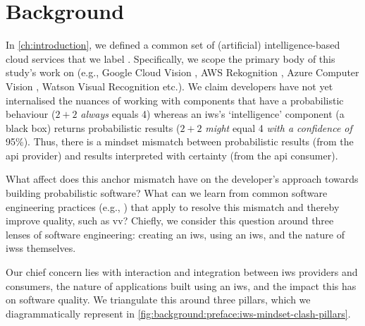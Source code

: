 \chapter{Background}
\label{ch:background}

\graphicspath{{mainmatter/background/figures/}}

\label{sec:background:preface}

In \cref{ch:introduction}, we defined a common set of (artificial) intelligence-based cloud services that we label . Specifically, we scope the primary body of this study's work on  (e.g., Google Cloud Vision \citep{GoogleCloud:Home}, AWS Rekognition \citep{AWS:Home}, Azure Computer Vision \citep{Azure:Home}, Watson Visual Recognition \citep{IBM:Home} etc.). We claim developers have not yet internalised the nuances of working with components that have a probabilistic behaviour ($2+2$ \textit{always} equals 4) whereas an \gls{iws}'s `intelligence' component (a black box) returns probabilistic results ($2+2$ \textit{might} equal 4 \textit{with a confidence of} 95\%). Thus, there is a mindset mismatch between probabilistic results (from the \gls{api} provider) and results interpreted with certainty (from the \gls{api} consumer).

What affect does this anchor mismatch have on the developer's approach towards building probabilistic software? What can we learn from common software engineering practices (e.g., \citep{Pressman:2005vf,Sommerville:2011uc}) that apply to resolve this mismatch and thereby improve quality, such as \gls{vv}? Chiefly, we consider this question around three lenses of software engineering: creating an \gls{iws}, using an \gls{iws}, and the nature of \glspl{iws} themselves.

Our chief concern lies with interaction and integration between \gls{iws} providers and consumers, the nature of applications built using an \gls{iws}, and the impact this has on software quality. We triangulate this around three pillars, which we diagrammatically represent in \cref{fig:background:preface:iws-mindset-clash-pillars}.
 
